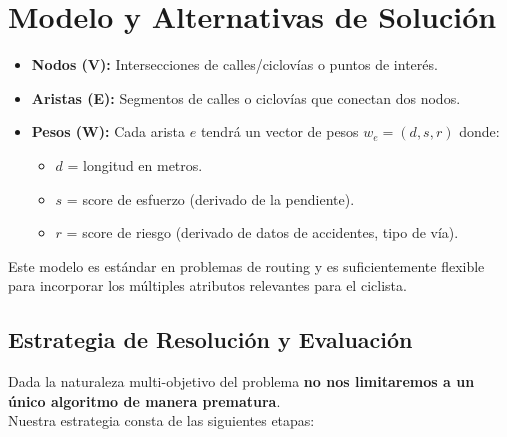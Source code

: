 \documentclass[12pt, a4paper, spanish]{article}
\begin{document}
\section{Modelo y Alternativas de Solución}

\begin{itemize}
    \item \textbf{Nodos (V):} Intersecciones de calles/ciclovías o puntos de interés.
    \item \textbf{Aristas (E):} Segmentos de calles o ciclovías que conectan dos nodos.
    \item \textbf{Pesos (W):} Cada arista \( e \) tendrá un vector de pesos \( w_e = (d, s, r) \) donde:
    \begin{itemize}
        \item \( d \) = longitud en metros.
        \item \( s \) = score de esfuerzo (derivado de la pendiente).
        \item \( r \) = score de riesgo (derivado de datos de accidentes, tipo de vía).
    \end{itemize}
\end{itemize}

Este modelo es estándar en problemas de routing \cite{bast2016} y es suficientemente flexible para incorporar los múltiples atributos relevantes para el ciclista.

\subsection{Estrategia de Resolución y Evaluación}
Dada la naturaleza multi-objetivo del problema \textbf{no nos limitaremos a un único algoritmo de manera prematura}.\\

Nuestra estrategia consta de las siguientes etapas:
\end{document}
